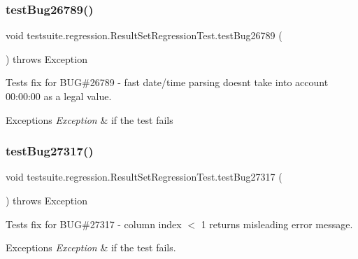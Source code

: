 \subsubsection{\texorpdfstring{test\+Bug26789()}{testBug26789()}}
{\footnotesize\ttfamily void testsuite.\+regression.\+Result\+Set\+Regression\+Test.\+test\+Bug26789 (\begin{DoxyParamCaption}{ }\end{DoxyParamCaption}) throws Exception}

Tests fix for B\+UG\#26789 -\/ fast date/time parsing doesn\textquotesingle{}t take into account 00\+:00\+:00 as a legal value.


\begin{DoxyExceptions}{Exceptions}
{\em Exception} & if the test fails \\
\hline
\end{DoxyExceptions}
\mbox{\label{classtestsuite_1_1regression_1_1_result_set_regression_test_af045c2d205dada239fec239d477c2563}} 
\subsubsection{\texorpdfstring{test\+Bug27317()}{testBug27317()}}
{\footnotesize\ttfamily void testsuite.\+regression.\+Result\+Set\+Regression\+Test.\+test\+Bug27317 (\begin{DoxyParamCaption}{ }\end{DoxyParamCaption}) throws Exception}

Tests fix for B\+UG\#27317 -\/ column index $<$ 1 returns misleading error message.


\begin{DoxyExceptions}{Exceptions}
{\em Exception} & if the test fails. \\
\hline
\end{DoxyExceptions}
\mbox{\label{classtestsuite_1_1regression_1_1_result_set_regression_test_a85ca3f94b415a4fd27c69354a16eb5e5}} 
